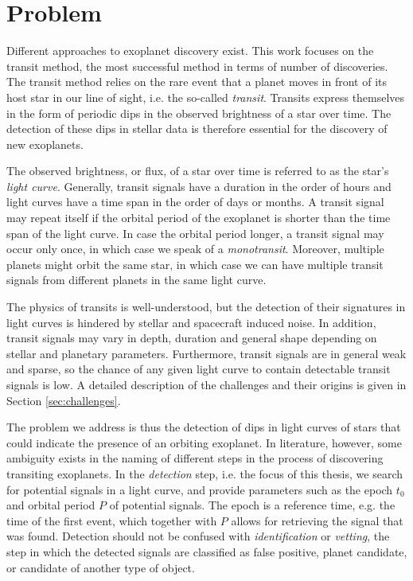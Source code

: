 
\section{Problem}

Different approaches to exoplanet discovery exist. This work focuses on the transit method, the most successful method in terms of number of discoveries. The transit method relies on the rare event that a planet moves in front of its host star in our line of sight, i.e. the so-called \textit{transit}. Transits express themselves in the form of periodic dips in the observed brightness of a star over time. The detection of these dips in stellar data is therefore essential for the discovery of new exoplanets. 

The observed brightness, or flux, of a star over time is referred to as the star's \textit{light curve}. Generally, transit signals have a duration in the order of hours and light curves have a time span in the order of days or months. A transit signal may repeat itself if the orbital period of the exoplanet is shorter than the time span of the light curve. In case the orbital period longer, a transit signal may occur only once, in which case we speak of a \textit{monotransit}. Moreover, multiple planets might orbit the same star, in which case we can have multiple transit signals from different planets in the same light curve.

The physics of transits is well-understood, but the detection of their signatures in light curves is hindered by stellar and spacecraft induced noise. In addition, transit signals may vary in depth, duration and general shape depending on stellar and planetary parameters. Furthermore, transit signals are in general weak and sparse, so the chance of any given light curve to contain detectable transit signals is low. A detailed description of the challenges and their origins is given in Section \ref{sec:challenges}.

The problem we address is thus the detection of dips in light curves of stars that could indicate the presence of an orbiting exoplanet. In literature, however, some ambiguity exists in the naming of different steps in the process of discovering transiting exoplanets. In the \textit{detection} step, i.e. the focus of this thesis, we search for potential signals in a light curve, and provide parameters such as the epoch $t_0$ and orbital period $P$ of potential signals. The epoch is a reference time, e.g. the time of the first event, which together with $P$ allows for retrieving the signal that was found. Detection should not be confused with \textit{identification} or \textit{vetting}, the step in which the detected signals are classified as false positive, planet candidate, or candidate of another type of object.
